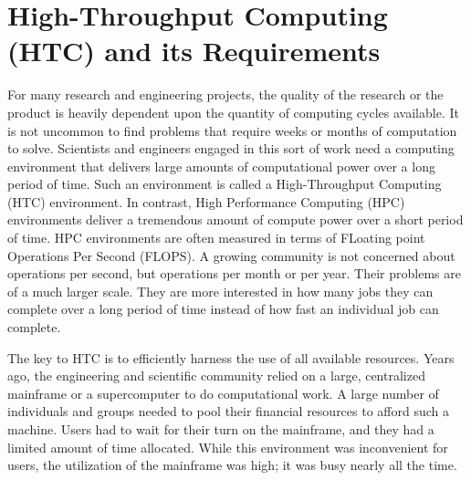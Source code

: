 
\section{\label{sec:overview}High-Throughput Computing (HTC) and its Requirements}

For many research and engineering projects, the quality of the research
or the product is heavily dependent upon the quantity of computing
cycles available.
It is not uncommon to find problems that require weeks
or months of computation to solve.
Scientists and engineers engaged in
this sort of work need a computing environment that delivers large
amounts of computational power over a long period of time.
Such an environment is called a High-Throughput Computing (HTC) environment.
In contrast, High Performance Computing (HPC)
environments deliver a
tremendous amount of compute power over a short period of time.
HPC environments are often measured in terms of FLoating point Operations
Per Second (FLOPS). 
A growing community is not concerned about operations per second,
but operations per month or per year.
Their problems are of a much larger scale.
They are
more interested in how many jobs they can complete over a long period of
time instead of how fast an individual job can complete.

The key to HTC is to efficiently harness the use of all available
resources. Years ago, the engineering and scientific community relied on
a large, centralized mainframe or a supercomputer to do
computational work. 
A large number of individuals and groups needed
to pool their financial resources to afford such a machine.
Users had to wait for their turn on the mainframe, 
and they had a limited amount of time allocated.
While this environment was inconvenient for users,
the utilization of the mainframe was high;
it was busy nearly all the time.

